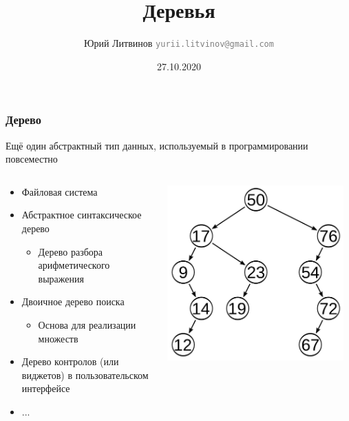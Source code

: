 \documentclass[xetex,mathserif,serif]{beamer}
\title{Деревья}
\author[Юрий Литвинов]{Юрий Литвинов \newline \textcolor{gray}{\small\texttt{yurii.litvinov@gmail.com}}}
\date{27.10.2020}
\begin{document}
    
    \frame{\titlepage}
    
    \begin{frame}
        \frametitle{Дерево}
        Ещё один абстрактный тип данных, используемый в программировании повсеместно
        \begin{columns}
            \begin{column}{0.55\textwidth}
                \begin{itemize}
                    \item Файловая система
                    \item Абстрактное синтаксическое дерево
                    \begin{itemize}
                        \item Дерево разбора арифметического выражения
                    \end{itemize}
                    \item Двоичное дерево поиска
                    \begin{itemize}
                        \item Основа для реализации множеств
                    \end{itemize}
                    \item Дерево контролов (или виджетов) в пользовательском интерфейсе
                    \item ...
                \end{itemize}
            \end{column}
            \begin{column}{0.45\textwidth}
                \begin{center}
                    \includegraphics[width=0.95\textwidth]{tree.png}
                \end{center}
            \end{column}
        \end{columns}
    \end{frame}
\end{document}
